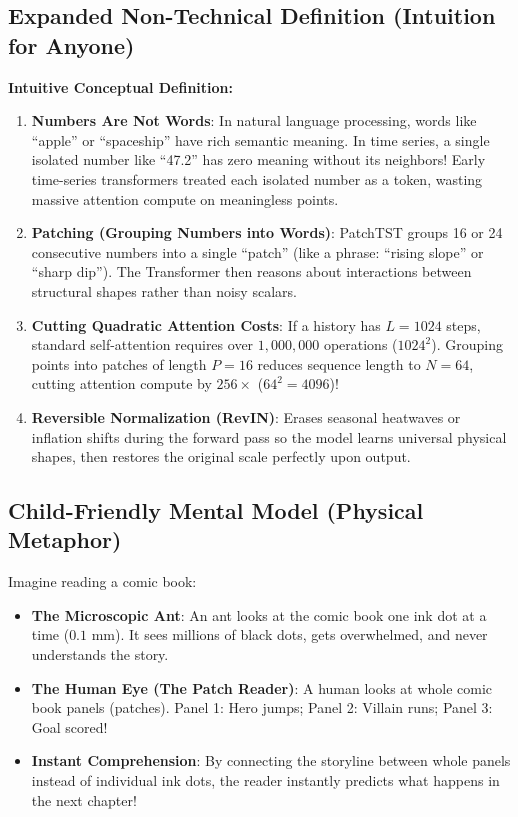 \documentclass[11pt,a4paper]{article}
\theoremstyle{definition}
\begin{document}
\subsection{Expanded Non-Technical Definition (Intuition for Anyone)}
\textbf{Intuitive Conceptual Definition:}
\begin{enumerate}
    \item \textbf{Numbers Are Not Words}: In natural language processing, words like ``apple'' or ``spaceship'' have rich semantic meaning. In time series, a single isolated number like ``47.2'' has zero meaning without its neighbors! Early time-series transformers treated each isolated number as a token, wasting massive attention compute on meaningless points.
    \item \textbf{Patching (Grouping Numbers into Words)}: PatchTST groups 16 or 24 consecutive numbers into a single ``patch'' (like a phrase: ``rising slope'' or ``sharp dip''). The Transformer then reasons about interactions between structural shapes rather than noisy scalars.
    \item \textbf{Cutting Quadratic Attention Costs}: If a history has $L = 1024$ steps, standard self-attention requires over $1,000,000$ operations ($1024^2$). Grouping points into patches of length $P=16$ reduces sequence length to $N = 64$, cutting attention compute by $256\times$ ($64^2 = 4096$)!
    \item \textbf{Reversible Normalization (RevIN)}: Erases seasonal heatwaves or inflation shifts during the forward pass so the model learns universal physical shapes, then restores the original scale perfectly upon output.
\end{enumerate}

\subsection{Child-Friendly Mental Model (Physical Metaphor)}
Imagine reading a comic book:
\begin{itemize}
    \item \textbf{The Microscopic Ant}: An ant looks at the comic book one ink dot at a time ($0.1$ mm). It sees millions of black dots, gets overwhelmed, and never understands the story.
    \item \textbf{The Human Eye (The Patch Reader)}: A human looks at whole comic book panels (patches). Panel 1: Hero jumps; Panel 2: Villain runs; Panel 3: Goal scored!
    \item \textbf{Instant Comprehension}: By connecting the storyline between whole panels instead of individual ink dots, the reader instantly predicts what happens in the next chapter!
\end{itemize}
\end{document}
